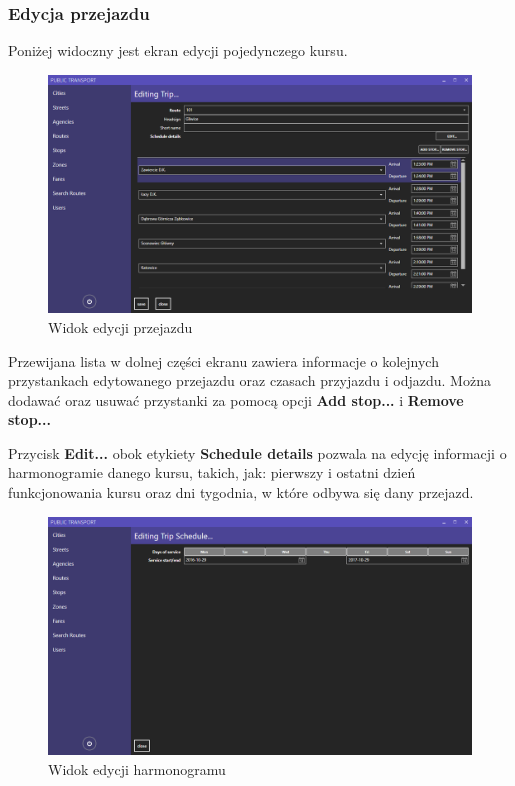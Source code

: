 \documentclass[10pt,a4paper]{article}
\begin{document}
\subsubsection{Edycja przejazdu}
Poniżej widoczny jest ekran edycji pojedynczego kursu.
\begin{figure}[H]
	\centering
	\includegraphics[width=15cm]{screenshots/11_edit_trip.png}
	\caption{Widok edycji przejazdu}
\end{figure}
Przewijana lista w dolnej części ekranu zawiera informacje o kolejnych przystankach edytowanego przejazdu oraz czasach przyjazdu i odjazdu. Można dodawać oraz usuwać przystanki za pomocą opcji \textbf{Add stop...} i \textbf{Remove stop...} 

Przycisk \textbf{Edit...} obok etykiety \textbf{Schedule details} pozwala na edycję informacji o harmonogramie danego kursu, takich, jak: pierwszy i ostatni dzień funkcjonowania kursu oraz dni tygodnia, w które odbywa się dany przejazd.
\begin{figure}[H]
	\centering
	\includegraphics[width=15cm]{screenshots/12_edit_schedule.png}
	\caption{Widok edycji harmonogramu}
\end{figure}
\end{document}
